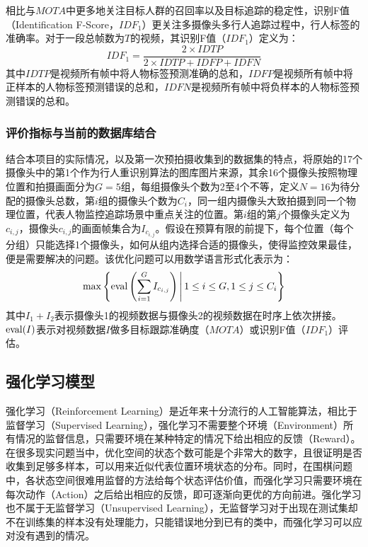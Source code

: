相比与$\mathit{MOTA}$中更多地关注目标人群的召回率以及目标追踪的稳定性，识别F值（Identification F-Score，$\mathit{IDF_1}$）更关注多摄像头多行人追踪过程中，行人标签的准确率。对于一段总帧数为$T$的视频，其识别F值（$\mathit{IDF_1}$）定义为：
\begin{equation}
\mathit{IDF_1}=\frac{2\times\mathit{IDTP}}{2\times\mathit{IDTP}+\mathit{IDFP}+\mathit{IDFN}}
\end{equation}
其中$\mathit{IDTP}$是视频所有帧中将人物标签预测准确的总和，$\mathit{IDFP}$是视频所有帧中将正样本的人物标签预测错误的总和，$\mathit{IDFN}$是视频所有帧中将负样本的人物标签预测错误的总和。

\subsubsection{评价指标与当前的数据库结合}

结合本项目的实际情况，以及第一次预拍摄收集到的数据集的特点，将原始的17个摄像头中的第1个作为行人重识别算法的图库图片来源，其余16个摄像头按照物理位置和拍摄画面分为$G=5$组，每组摄像头个数为2至4个不等，定义$N=16$为待分配的摄像头总数，第$i$组的摄像头个数为$C_i$，同一组内摄像头大致拍摄到同一个物理位置，代表人物监控追踪场景中重点关注的位置。第$i$组的第$j$个摄像头定义为$c_{i,j}$，摄像头$c_{i,j}$的画面帧集合为$I_{c_{i,j}}$。假设在预算有限的前提下，每个位置（每个分组）只能选择1个摄像头，如何从组内选择合适的摄像头，使得监控效果最佳，便是需要解决的问题。该优化问题可以用数学语言形式化表示为：
\begin{equation}
\max \left\{\mathop{\rm eval}\left(\sum_{i=1}^G I_{c_{i,j}}\right)\,\middle\vert\, 1\leq i \leq G, 1\leq j \leq C_i\right\}
\end{equation}
其中$I_1+I_2$表示摄像头1的视频数据与摄像头2的视频数据在时序上依次拼接。$\mathop{\rm eval}(I)$表示对视频数据$I$做多目标跟踪准确度（$\mathit{MOTA}$）或识别F值（$\mathit{IDF_1}$）评估。

\subsection{强化学习模型}

强化学习（Reinforcement Learning）是近年来十分流行的人工智能算法，相比于监督学习（Supervised Learning），强化学习不需要整个环境（Environment）所有情况的监督信息，只需要环境在某种特定的情况下给出相应的反馈（Reward）。在很多现实问题当中，优化空间的状态个数可能是个非常大的数字，且很证明是否收集到足够多样本，可以用来近似代表位置环境状态的分布。同时，在围棋问题中\cite{silver2016mastering}，各状态空间很难用监督的方法给每个状态评估价值，而强化学习只需要环境在每次动作（Action）之后给出相应的反馈，即可逐渐向更优的方向前进。强化学习也不属于无监督学习（Unsupervised Learning），无监督学习对于出现在测试集却不在训练集的样本没有处理能力，只能错误地分到已有的类中，而强化学习可以应对没有遇到的情况。

